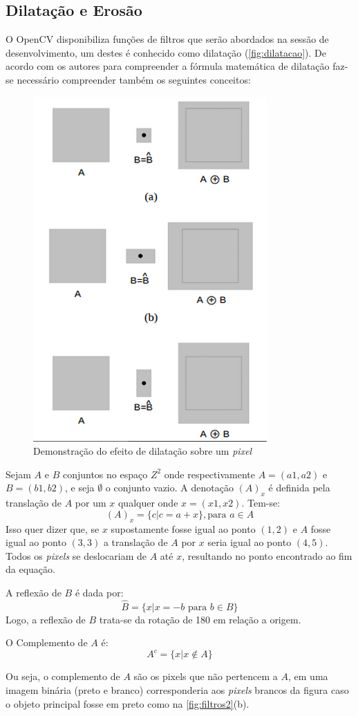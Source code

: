 \subsection{Dilatação e Erosão}	
O OpenCV disponibiliza funções de filtros que serão abordados na sessão de desenvolvimento, um destes é conhecido como dilatação (\autoref{fig:dilatacao}). De acordo com os autores \cite{oge1999processamento} para compreender a fórmula matemática de dilatação faz-se necessário compreender também os seguintes conceitos:

\begin{figure}[htbp]
\caption{\label{fig:dilatacao}Demonstração do efeito de dilatação sobre um \textit{pixel}}
\begin{center}
\includegraphics[width=.3\textwidth]{figuras/f1c3.png}
\end{center}
\end{figure} 

Sejam $A$ e $B$ conjuntos no espaço $ Z^2 $ onde respectivamente $A = (a1 , a2)$ e $B = (b1 , b2)$, e seja $\emptyset$ o conjunto vazio. A denotação $(A)_x$ é definida pela translação de $A$ por um $x$ qualquer onde $x = (x1 ,  x2)$. Tem-se:
\[
(A)_x = \{c | c = a + x\}, \mbox{para~} a \in A
\]
Isso quer dizer que, se $x$ supostamente fosse igual ao ponto $(1,2)$ e $A$ fosse igual ao ponto $(3,3)$ a translação de $A$ por $x$ seria igual ao ponto $(4,5)$. Todos os \textit{pixels} se deslocariam de $A$ até $x$, resultando no ponto encontrado ao fim da equação.

A reflexão de $B$ é dada por:
\[
\hat{B} = \{x | x = -b \mbox{ para } b \in B\}
\]
Logo, a reflexão de $B$ trata-se da rotação de 180\textordmasculine \hspace{} em relação a origem.

O Complemento de $A$ é:
\[
A^c = \{x | x \not \in A\}
\]

Ou seja, o complemento de $A$ são os pixels que não pertencem a $A$, em uma imagem binária (preto e branco) corresponderia aos \textit{pixels} brancos da figura caso o objeto principal fosse em preto como na \autoref{fig:filtros2}(b).

